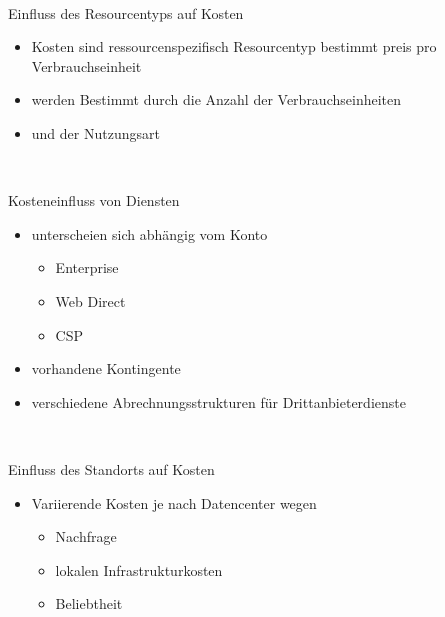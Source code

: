 \documentclass{scrartcl}
\newenvironment{flashcard}[2][]{%
    #1
    \vfill
    \centerline{\Large{#2}}
    \vfill
\newpage
}
{\newpage}
\begin{document}
    \begin{flashcard}[\ ]{Einfluss des Resourcentyps auf Kosten}
        \begin{itemize}
            \item Kosten sind ressourcenspezifisch\newline
            Resourcentyp bestimmt preis pro Verbrauchseinheit
            \item werden Bestimmt durch die Anzahl der Verbrauchseinheiten
            \item und der Nutzungsart
        \end{itemize}

    \end{flashcard}

    \begin{flashcard}[\ ]{Kosteneinfluss von Diensten}
        \begin{itemize}
            \item unterscheien sich abhängig vom Konto
            \begin{itemize}
                \item Enterprise
                \item Web Direct
                \item CSP
            \end{itemize}
            \item vorhandene Kontingente
            \item verschiedene Abrechnungsstrukturen für Drittanbieterdienste
        \end{itemize}
    \end{flashcard}

    \begin{flashcard}[\ ]{Einfluss des Standorts auf Kosten}
        \begin{itemize}
            \item Variierende Kosten je nach Datencenter wegen
            \begin{itemize}
                \item Nachfrage
                \item lokalen Infrastrukturkosten
                \item Beliebtheit
            \end{itemize}
        \end{itemize}

    \end{flashcard}
\end{document}
